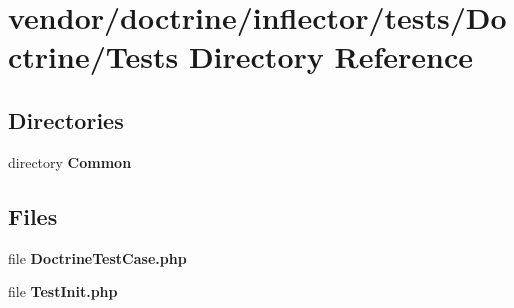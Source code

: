 \section{vendor/doctrine/inflector/tests/\+Doctrine/\+Tests Directory Reference}
\label{dir_4655fab16a103b88c316da72f9cb7d13}
\subsection*{Directories}
\begin{DoxyCompactItemize}
\item 
directory {\bf Common}
\end{DoxyCompactItemize}
\subsection*{Files}
\begin{DoxyCompactItemize}
\item 
file {\bf Doctrine\+Test\+Case.\+php}
\item 
file {\bf Test\+Init.\+php}
\end{DoxyCompactItemize}
